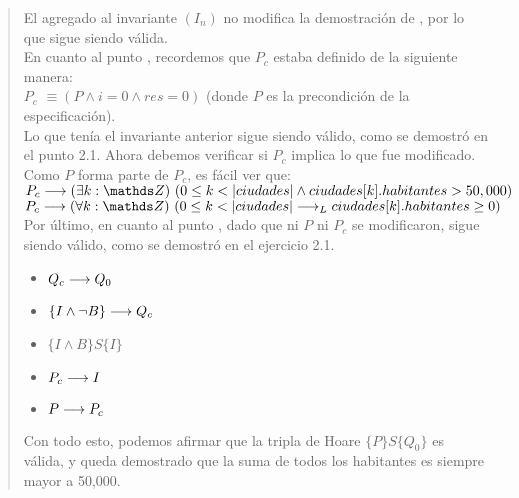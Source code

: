 \documentclass[10pt,a4paper]{article}
\begin{document}
\begin{quote}
El agregado al invariante $(I_n)$ no modifica la demostración de \textbf{}, por lo que sigue siendo válida. \\ [0.2cm]

En cuanto al punto \textbf{}, recordemos que $P_c$ estaba definido de la siguiente manera: \\ [0.2cm]
\textbf{$P_c$} $\equiv (P \land i = 0 \land res = 0)$ (donde $P$ es la precondición de la especificación). \\ [0.2cm]
Lo que tenía el invariante anterior sigue siendo válido, como se demostró en el punto 2.1. Ahora debemos verificar si $P_c$ implica lo que fue modificado. \\ [0.2cm]
Como $P$ forma parte de $P_c$, es fácil ver que: \\ [0.1cm]
$P_c \implica \existe[unalinea]{k}{\ent}{0 \leq k < \longitud{ciudades} \land ciudades[k].habitantes > 50,000}$ \\ 
$P_c \implica \paraTodo[unalinea]{k}{\ent}{0 \leq k < \longitud{ciudades} \implicaLuego ciudades[k].habitantes \geq 0}$ \\ [0.2cm]

Por último, en cuanto al punto \textbf{}, dado que ni $P$ ni $P_c$ se modificaron, sigue siendo válido, como se demostró en el ejercicio 2.1. \\ [0.2cm]
\begin{itemize}
	\item \textbf{ $Q_c \longrightarrow Q_0$} \checkmark
	\item \textbf{ $\{I \land \neg B\} \longrightarrow Q_c$} \checkmark
	\item \textbf{ $\{I \land B\} S \{I\}$} \checkmark
	\item \textbf{ $P_c \longrightarrow I$} \checkmark
	\item \textbf{ $P \longrightarrow P_c$} \checkmark
\end{itemize}

Con todo esto, podemos afirmar que la tripla de Hoare $\{P\} S \{Q_0\}$ es válida, y queda demostrado que la suma de todos los habitantes es siempre mayor a 50,000.


\end{quote}
\end{document}
